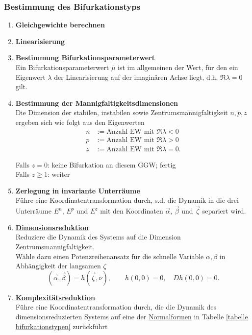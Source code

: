 \documentclass{article}
\begin{document}
\newpage


\subsubsection{Bestimmung des Bifurkationstyps}
	\begin{enumerate}
		\item \textbf{Gleichgewichte berechnen}
		
		
		\item \textbf{Linearisierung}
		
		
		\item \textbf{Bestimmung Bifurkationsparameterwert}\\
		Ein Bifurkationsparameterwert $\bar{\mu}$ ist im allgemeinen der Wert, für den ein Eigenwert $\lambda$ der Linearisierung auf der imaginären Achse liegt, d.h. $\Re\lambda=0$ gilt.
		
		
		\item \textbf{Bestimmung der Mannigfaltigkeitsdimensionen}\\
		Die Dimension der stabilen, instabilen sowie Zentrumsmannigfaltigkeit $n, p, z$ ergeben sich wie folgt aus den Eigenwerten
			\begin{align}
				n &:= \text{Anzahl EW mit } \Re \lambda < 0 \\
				p &:= \text{Anzahl EW mit } \Re \lambda > 0 \\
				z &:= \text{Anzahl EW mit } \Re \lambda = 0.
			\end{align}
		
		Falls $z=0$: keine Bifurkation an diesem GGW; fertig\\
		Falls $z \geq 1$: weiter
		
		
		\item \textbf{Zerlegung in invariante Unterräume}\\
		Führe eine Koordinatentransformation durch, s.d. die Dynamik in die drei Unterräume $E^n$, $E^p$ und $E^z$ mit den Koordinaten $\vec{\alpha}$, $\vec{\beta}$ und $\vec{\zeta}$ separiert wird.
		
		
		\item \underline{\textbf{Dimensionsreduktion}}\\
		Reduziere die Dynamik des Systems auf die Dimension Zentrumsmannigfaltigkeit.\\
		Wähle dazu einen Potenzreihenansatz für die schnelle Variable $\alpha, \beta$ in Abhängigkeit der langsamen $\zeta$
			\begin{equation}
				(\vec\alpha,\vec\beta)=h(\vec\zeta,\nu),\qquad h(0,0)=0,\quad Dh(0,0)=0.
			\end{equation}
		
		
		\item \underline{\textbf{Komplexitätsreduktion}}\\
		Führe eine Koordinatentransformation durch, die die Dynamik des dimensionsreduzierten Systems auf eine der \underline{Normalformen} in Tabelle \ref{tabelle bifurkationstypen} zurückführt
	\end{enumerate}
\end{document}
